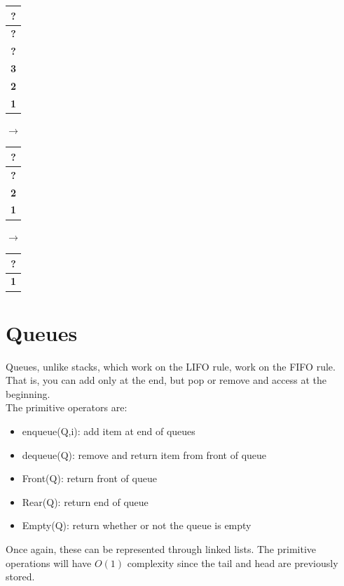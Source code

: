 \documentclass[nobib]{tufte-handout}
\begin{document}
\begin{table}
\begin{tabular}[b]{|c|}
        \hline
        \textbf{?} \\
        \hline
        \textbf{?} \\
        \hline
        \textbf{?} \\
        \hline
        \textbf{3} \\
        \hline
        \textbf{2} \\
        \hline
        \textbf{1} \\
        \hline
    \end{tabular}
    $\rightarrow$
    \begin{tabular}[b]{|c|}
        \hline
        \textbf{?} \\
        \hline
        \textbf{?} \\
        \hline
        \textbf{2} \\
        \hline
        \textbf{1} \\
        \hline
    \end{tabular}
    $\rightarrow$
    \begin{tabular}[b]{|c|}
        \hline
        \textbf{?} \\
        \hline
        \textbf{1} \\
        \hline
    \end{tabular}
\end{table}
\section{Queues}
Queues, unlike stacks, which work on the LIFO rule, work on the FIFO rule. That
is, you can add only at the end, but pop or remove and access at the
beginning.\\ The primitive operators are:
\begin{itemize}
    \item enqueue(Q,i): add item at end of queues
    \item dequeue(Q): remove and return item from front of queue
    \item Front(Q): return front of queue
    \item Rear(Q): return end of queue
    \item Empty(Q): return whether or not the queue is empty
\end{itemize}
Once again, these can be represented through linked lists. The primitive operations will have $O(1)$ complexity since the tail and head are previously stored.\\
\end{document}
